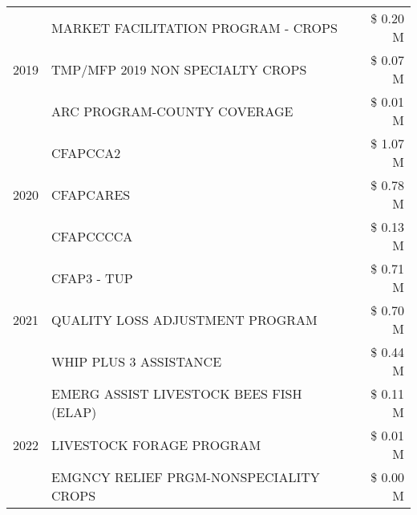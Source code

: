 \begin{tabular}{llr}
\cline{1-3}
\multirow[t]{3}{*}{2019} & MARKET FACILITATION PROGRAM - CROPS & \$ 0.20 M \\
 & TMP/MFP 2019 NON SPECIALTY CROPS & \$ 0.07 M \\
 & ARC PROGRAM-COUNTY COVERAGE & \$ 0.01 M \\
\cline{1-3}
\multirow[t]{3}{*}{2020} & CFAPCCA2 & \$ 1.07 M \\
 & CFAPCARES & \$ 0.78 M \\
 & CFAPCCCCA & \$ 0.13 M \\
\cline{1-3}
\multirow[t]{3}{*}{2021} & CFAP3 - TUP & \$ 0.71 M \\
 & QUALITY LOSS ADJUSTMENT PROGRAM & \$ 0.70 M \\
 & WHIP PLUS 3 ASSISTANCE & \$ 0.44 M \\
\cline{1-3}
\multirow[t]{3}{*}{2022} & EMERG ASSIST LIVESTOCK BEES FISH (ELAP) & \$ 0.11 M \\
 & LIVESTOCK FORAGE PROGRAM & \$ 0.01 M \\
 & EMGNCY RELIEF PRGM-NONSPECIALITY CROPS & \$ 0.00 M \\
\cline{1-3}
\bottomrule
\end{tabular}
